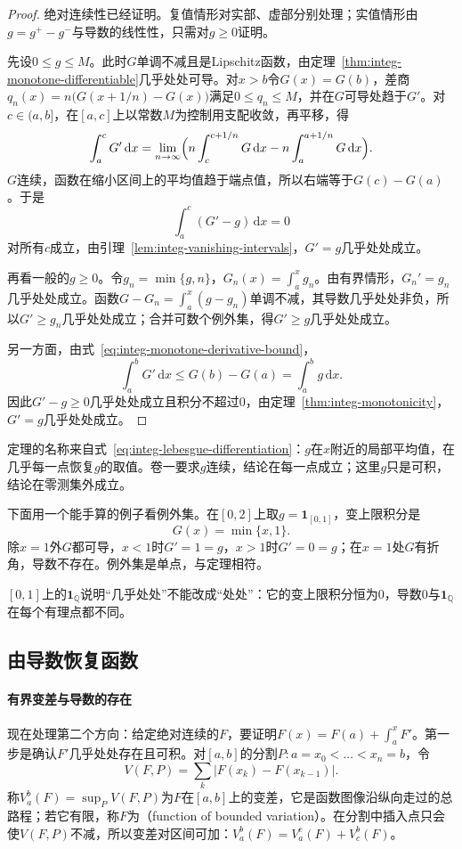 \begin{proof}
绝对连续性已经证明。复值情形对实部、虚部分别处理；实值情形由$g=g^+-g^-$与导数的线性性，只需对$g\geq0$证明。

先设$0\leq g\leq M$。此时$G$单调不减且是Lipschitz函数，由定理~\ref{thm:integ-monotone-differentiable}几乎处处可导。对$x>b$令$G(x)=G(b)$，差商$q_n(x)=n\bigl(G(x+1/n)-G(x)\bigr)$满足$0\leq q_n\leq M$，并在$G$可导处趋于$G'$。对$c\in(a,b]$，在$[a,c]$上以常数$M$为控制用支配收敛，再平移，得
\[
 \int_a^cG'\,\mathrm dx=\lim_{n\to\infty}\Bigl(n\int_c^{c+1/n}G\,\mathrm dx-n\int_a^{a+1/n}G\,\mathrm dx\Bigr).
\]
$G$连续，函数在缩小区间上的平均值趋于端点值，所以右端等于$G(c)-G(a)$。于是
\[
 \int_a^c(G'-g)\,\mathrm dx=0
\]
对所有$c$成立，由引理~\ref{lem:integ-vanishing-intervals}，$G'=g$几乎处处成立。

再看一般的$g\geq0$。令$g_n=\min\{g,n\}$，$G_n(x)=\int_a^xg_n$。由有界情形，$G_n'=g_n$几乎处处成立。函数$G-G_n=\int_a^x(g-g_n)$单调不减，其导数几乎处处非负，所以$G'\geq g_n$几乎处处成立；合并可数个例外集，得$G'\geq g$几乎处处成立。

另一方面，由式~\eqref{eq:integ-monotone-derivative-bound}，
\[
 \int_a^bG'\,\mathrm dx\leq G(b)-G(a)=\int_a^bg\,\mathrm dx .
\]
因此$G'-g\geq0$几乎处处成立且积分不超过$0$，由定理~\ref{thm:integ-monotonicity}，$G'=g$几乎处处成立。
\end{proof}

定理的名称来自式~\eqref{eq:integ-lebesgue-differentiation}：$g$在$x$附近的局部平均值，在几乎每一点恢复$g$的取值。卷一要求$g$连续，结论在每一点成立；这里$g$只是可积，结论在零测集外成立。

下面用一个能手算的例子看例外集。在$[0,2]$上取$g=\mathbf 1_{[0,1]}$，变上限积分是
\[
 G(x)=\min\{x,1\}.
\]
除$x=1$外$G$都可导，$x<1$时$G'=1=g$，$x>1$时$G'=0=g$；在$x=1$处$G$有折角，导数不存在。例外集是单点，与定理相符。

$[0,1]$上的$\mathbf 1_{\mathbb Q}$说明“几乎处处”不能改成“处处”：它的变上限积分恒为$0$，导数$0$与$\mathbf 1_{\mathbb Q}$在每个有理点都不同。

\subsection{由导数恢复函数}
\label{sec:integ-recovery}

\paragraph{有界变差与导数的存在}
现在处理第二个方向：给定绝对连续的$F$，要证明$F(x)=F(a)+\int_a^xF'$。第一步是确认$F'$几乎处处存在且可积。对$[a,b]$的分割$P:a=x_0<\dots<x_n=b$，令
\[
 V(F,P)=\sum_k\lvert F(x_k)-F(x_{k-1})\rvert .
\]
称$V_a^b(F)=\sup_PV(F,P)$为$F$在$[a,b]$上的变差，它是函数图像沿纵向走过的总路程；若它有限，称$F$为（function of bounded variation）。在分割中插入点只会使$V(F,P)$不减，所以变差对区间可加：$V_a^b(F)=V_a^c(F)+V_c^b(F)$。

